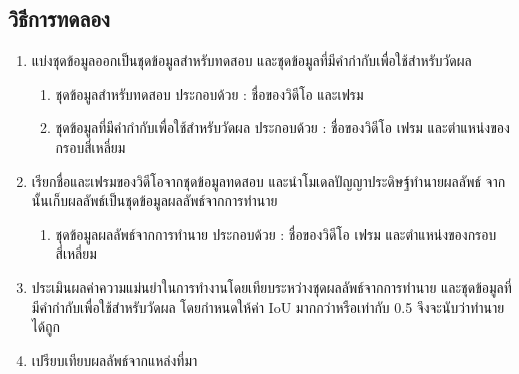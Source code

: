 \subsection*{วิธีการทดลอง}
	\begin{enumerate}
		\setlength\itemsep{-0.25em}
		\item แบ่งชุดข้อมูลออกเป็นชุดข้อมูลสำหรับทดสอบ และชุดข้อมูลที่มีคำกำกับเพื่อใช้สำหรับวัดผล
			\begin{enumerate}
				\setlength\itemsep{-0.25em}
				\item ชุดข้อมูลสำหรับทดสอบ ประกอบด้วย : ชื่อของวิดีโอ และเฟรม
				\item ชุดข้อมูลที่มีคำกำกับเพื่อใช้สำหรับวัดผล ประกอบด้วย : ชื่อของวิดีโอ เฟรม และตำแหน่งของกรอบสี่เหลี่ยม
			\end{enumerate}
		\item เรียกชื่อและเฟรมของวิดีโอจากชุดข้อมูลทดสอบ และนำโมเดลปัญญาประดิษฐ์ทำนายผลลัพธ์ จากนั้นเก็บผลลัพธ์เป็นชุดข้อมูลผลลัพธ์จากการทำนาย
			\begin{enumerate}
				\setlength\itemsep{-0.25em}
				\item ชุดข้อมูลผลลัพธ์จากการทำนาย ประกอบด้วย : ชื่อของวิดีโอ เฟรม และตำแหน่งของกรอบสี่เหลี่ยม
			\end{enumerate}
		\item ประเมินผลค่าความแม่นยำในการทำงานโดยเทียบระหว่างชุดผลลัพธ์จากการทำนาย และชุดข้อมูลที่มีคำกำกับเพื่อใช้สำหรับวัดผล โดยกำหนดให้ค่า IoU มากกว่าหรือเท่ากับ 0.5	
		จึงจะนับว่าทำนายได้ถูก
		\item เปรียบเทียบผลลัพธ์จากแหล่งที่มา
\end{enumerate}
